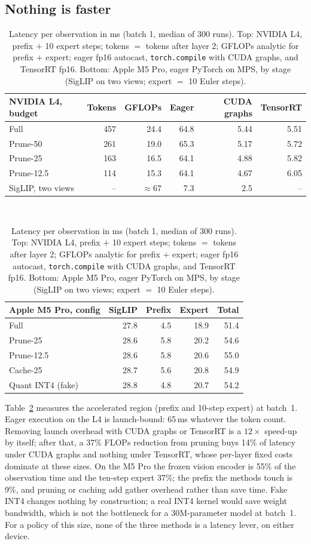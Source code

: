 \documentclass[11pt]{article}
\begin{document}
\subsection{Nothing is faster}
\label{sec:latency}

\begin{table}[t]
\centering
\small
\begin{tabular}{lrrrrr}
\toprule
NVIDIA L4, budget & Tokens & GFLOPs & Eager & CUDA graphs & TensorRT \\
\midrule
Full & 457 & 24.4 & 64.8 & 5.44 & 5.51 \\
Prune-50 & 261 & 19.0 & 65.3 & 5.17 & 5.72 \\
Prune-25 & 163 & 16.5 & 64.1 & 4.88 & 5.82 \\
Prune-12.5 & 114 & 15.3 & 64.1 & 4.67 & 6.05 \\
SigLIP, two views & -- & $\approx 67$ & 7.3 & 2.5 & -- \\
\bottomrule
\end{tabular}\\[6pt]
\begin{tabular}{lrrrr}
\toprule
Apple M5 Pro, config & SigLIP & Prefix & Expert & Total \\
\midrule
Full & 27.8 & 4.5 & 18.9 & 51.4 \\
Prune-25 & 28.6 & 5.8 & 20.2 & 54.6 \\
Prune-12.5 & 28.6 & 5.8 & 20.6 & 55.0 \\
Cache-25 & 28.7 & 5.6 & 20.8 & 54.9 \\
Quant INT4 (fake) & 28.8 & 4.8 & 20.7 & 54.2 \\
\bottomrule
\end{tabular}
\caption{Latency per observation in ms (batch 1, median of 300 runs). Top: NVIDIA L4, prefix $+$ 10 expert steps; tokens $=$ tokens after layer 2; GFLOPs analytic for prefix $+$ expert; eager fp16 autocast, \texttt{torch.compile} with CUDA graphs, and TensorRT fp16. Bottom: Apple M5 Pro, eager PyTorch on MPS, by stage (SigLIP on two views; expert $=$ 10 Euler steps).}
\label{tab:latency}
\end{table}

Table~\ref{tab:latency} measures the accelerated region (prefix and 10-step expert) at batch~1. Eager execution on the L4 is launch-bound: 65\,ms whatever the token count. Removing launch overhead with CUDA graphs or TensorRT is a $12\times$ speed-up by itself; after that, a 37\% FLOPs reduction from pruning buys 14\% of latency under CUDA graphs and nothing under TensorRT, whose per-layer fixed costs dominate at these sizes. On the M5 Pro the frozen vision encoder is 55\% of the observation time and the ten-step expert 37\%; the prefix the methods touch is 9\%, and pruning or caching add gather overhead rather than save time. Fake INT4 changes nothing by construction; a real INT4 kernel would save weight bandwidth, which is not the bottleneck for a 30M-parameter model at batch~1. For a policy of this size, none of the three methods is a latency lever, on either device.
\end{document}
